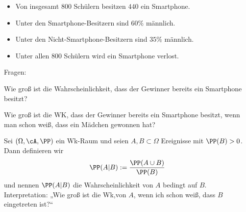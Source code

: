 \begin{itemize}
\item Von insgesamt $800$ Schülern besitzen $440$ ein Smartphone.
\item Unter den Smartphone-Besitzern sind $60\%$ männlich.
\item Unter den Nicht-Smartphone-Besitzern sind $35\%$ männlich.
\item Unter allen $800$ Schülern wird ein Smartphone verlost.
\end{itemize}
Fragen:
\begin{anumerate}
\item Wie groß ist die Wahrscheinlichkeit, dass der Gewinner bereits ein Smartphone besitzt?
\item Wie groß ist die WK, dass der Gewinner bereits ein Smartphone besitzt, wenn man schon weiß, dass ein Mädchen gewonnen hat?
\end{anumerate}

 Sei $(\Omega, \cA, \PP)$ ein Wk-Raum und seien $A, B \subset \Omega$ Ereignisse mit $\PP(B)>0$. Dann definieren wir $$\PP(A|B):=\frac{\PP(A \cup B)}{\PP(B)}$$ und nennen $\PP (A|B)$ die Wahrscheinlichkeit von $A$ bedingt auf $B$.\\
Interpretation: „Wie groß ist die Wk,von $A$, wenn ich schon weiß, dass $B$ eingetreten ist?“

